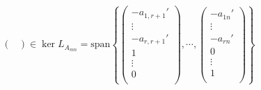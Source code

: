 \documentclass[dvipdfmx]{jsarticle}
\begin{document}
\begin{thm*}
\begin{enumerate}
\begin{align*}
\begin{pmatrix}
    \end{pmatrix} \in \ker L_{A_{mn}} = {\mathrm{span} }\left\{ \begin{pmatrix}
     - a_{1,r + 1}' \\
     \vdots \\
     - a_{r,r + 1}' \\
    1 \\
     \vdots \\
    0 \\
    \end{pmatrix},\cdots,\begin{pmatrix}
     - a_{1n}' \\
     \vdots \\
     - a_{rn}' \\
    0 \\
     \vdots \\
    1 \\
    \end{pmatrix} \right\}
    \end{align*}
    \end{enumerate}
\end{thm*}
\end{document}
